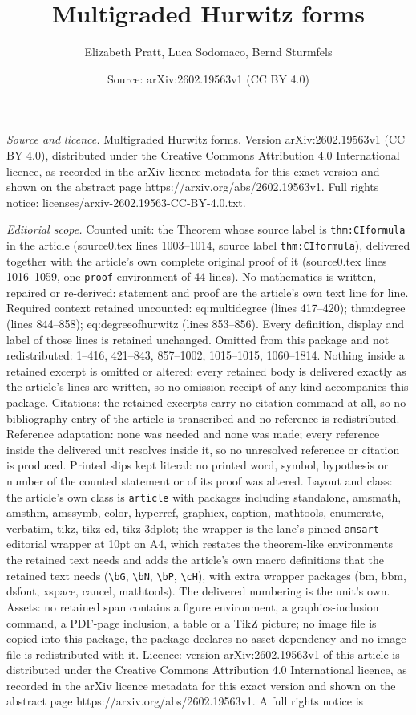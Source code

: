 \documentclass[10pt,a4paper]{amsart}
\title[Multigraded Hurwitz forms]{Multigraded Hurwitz forms}
\author{Elizabeth Pratt, Luca Sodomaco, Bernd Sturmfels}
\date{Source: arXiv:2602.19563v1 (CC BY 4.0)}
\begin{document}
\maketitle

\noindent\emph{Source and licence.} Multigraded Hurwitz forms. Version arXiv:2602.19563v1 (CC BY 4.0), distributed under the Creative Commons Attribution 4.0 International licence, as recorded in the arXiv licence metadata for this exact version and shown on the abstract page https://arxiv.org/abs/2602.19563v1. Full rights notice: licenses/arxiv-2602.19563-CC-BY-4.0.txt.\par\smallskip

\noindent\textit{Editorial scope.} Counted unit: the Theorem whose source label is \texttt{thm:CIformula} in the article (source0.tex lines 1003--1014, source label \texttt{thm:CIformula}), delivered together with the article's own complete original proof of it (source0.tex lines 1016--1059, one \texttt{proof} environment of 44 lines). No mathematics is written, repaired or re-derived: statement and proof are the article's own text line for line. Required context retained uncounted: eq:multidegree (lines 417--420); thm:degree (lines 844--858); eq:degreeofhurwitz (lines 853--856). Every definition, display and label of those lines is retained unchanged. Omitted from this package and not redistributed: 1--416, 421--843, 857--1002, 1015--1015, 1060--1814. Nothing inside a retained excerpt is omitted or altered: every retained body is delivered exactly as the article's lines are written, so no omission receipt of any kind accompanies this package. Citations: the retained excerpts carry no citation command at all, so no bibliography entry of the article is transcribed and no reference is redistributed. Reference adaptation: none was needed and none was made; every reference inside the delivered unit resolves inside it, so no unresolved reference or citation is produced. Printed slips kept literal: no printed word, symbol, hypothesis or number of the counted statement or of its proof was altered. Layout and class: the article's own class is \texttt{article} with packages including standalone, amsmath, amsthm, amssymb, color, hyperref, graphicx, caption, mathtools, enumerate, verbatim, tikz, tikz-cd, tikz-3dplot; the wrapper is the lane's pinned \texttt{amsart} editorial wrapper at 10pt on A4, which restates the theorem-like environments the retained text needs and adds the article's own macro definitions that the retained text needs (\texttt{\textbackslash bG}, \texttt{\textbackslash bN}, \texttt{\textbackslash bP}, \texttt{\textbackslash cH}), with extra wrapper packages (bm, bbm, dsfont, xspace, cancel, mathtools). The delivered numbering is the unit's own. Assets: no retained span contains a figure environment, a graphics-inclusion command, a PDF-page inclusion, a table or a TikZ picture; no image file is copied into this package, the package declares no asset dependency and no image file is redistributed with it. Licence: version arXiv:2602.19563v1 of this article is distributed under the Creative Commons Attribution 4.0 International licence, as recorded in the arXiv licence metadata for this exact version and shown on the abstract page https://arxiv.org/abs/2602.19563v1. A full rights notice is 
\end{document}
